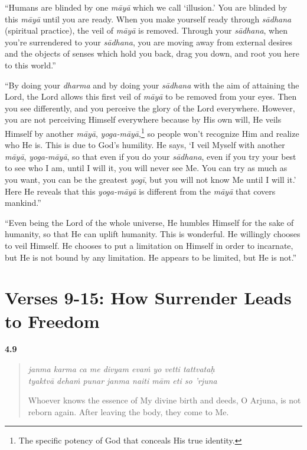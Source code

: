 \enquote{Humans are blinded by one \textit{māyā} which we call \enquote{illusion.} You are blinded by this \textit{māyā} until you are ready. When you make yourself ready through \textit{sādhana} (spiritual practice), the veil of \textit{māyā} is removed. Through your \textit{sādhana}, when you’re surrendered to your \textit{sādhana}, you are moving away from external desires and the objects of senses which hold you back, drag you down, and root you here to this world.}

\enquote{By doing your \textit{dharma} and by doing your \textit{sādhana} with the aim of attaining the Lord, the Lord allows this first veil of \textit{māyā} to be removed from your eyes. Then you see differently, and you perceive the glory of the Lord everywhere. However, you are not perceiving Himself everywhere because by His own will, He veils Himself by another \textit{māyā}, \textit{yoga-māyā},\footnote{The specific potency of God that conceals His true identity.} so people won’t recognize Him and realize who He is. This is due to God’s humility. He says, \enquote{I veil Myself with another \textit{māyā}, \textit{yoga-māyā}, so that even if you do your \textit{sādhana}, even if you try your best to see who I am, until I will it, you will never see Me. You can try as much as you want, you can be the greatest \textit{yogī}, but you will not know Me until I will it.} Here He reveals that this \textit{yoga-māyā} is different from the \textit{māyā} that covers mankind.}

\enquote{Even being the Lord of the whole universe, He humbles Himself for the sake of humanity, so that He can uplift humanity. This is wonderful. He willingly chooses to veil Himself. He chooses to put a limitation on Himself in order to incarnate, but He is not bound by any limitation. He appears to be limited, but He is not.}

\section{Verses 9-15: How Surrender Leads to Freedom}\label{sec-verses-9-15-how-surrender-leads-to-freedom}

\par\noindent\textbf{4.9}\par
\begin{verse}
\textit{janma karma ca me divyam evaṁ yo vetti tattvataḥ} \\
\textit{tyaktvā dehaṁ punar janma naiti mām eti so ’rjuna}

\noindent Whoever knows the essence of My divine birth and deeds, O Arjuna, is not reborn again. After leaving the body, they come to Me.
\end{verse}
\par



